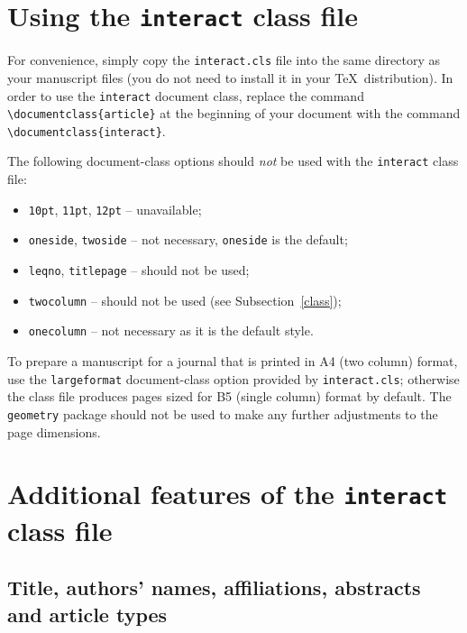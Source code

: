 \documentclass[]{interact}
\theoremstyle{plain}%
\theoremstyle{definition}
\theoremstyle{remark}
\begin{document}
\section{Using the \texttt{interact} class file}

For convenience, simply copy the \texttt{interact.cls} file into the same directory as your manuscript files (you do not need to install it in your \TeX\ distribution). In order to use the \texttt{interact} document class, replace the command \verb"\documentclass{article}" at the beginning of your document with the command \verb"\documentclass{interact}".

The following document-class options should \emph{not} be used with the \texttt{interact} class file:
\begin{itemize}
  \item \texttt{10pt}, \texttt{11pt}, \texttt{12pt} -- unavailable;
  \item \texttt{oneside}, \texttt{twoside} -- not necessary, \texttt{oneside} is the default;
  \item \texttt{leqno}, \texttt{titlepage} -- should not be used;
  \item \texttt{twocolumn} -- should not be used (see Subsection~\ref{class});
  \item \texttt{onecolumn} -- not necessary as it is the default style.
\end{itemize}
To prepare a manuscript for a journal that is printed in A4 (two column) format, use the \verb"largeformat" document-class option provided by \texttt{interact.cls}; otherwise the class file produces pages sized for B5 (single column) format by default. The \texttt{geometry} package should not be used to make any further adjustments to the page dimensions.


\section{Additional features of the \texttt{interact} class file}

\subsection{Title, authors' names, affiliations, abstracts and article types}
\end{document}
